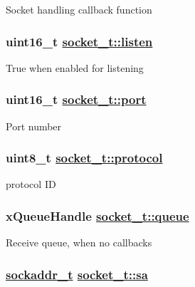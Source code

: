 Socket handling callback function \hypertarget{structsocket__t_367f8e34a0abb424055cc8fcb3388705}{
\subsubsection[listen]{\setlength{\rightskip}{0pt plus 5cm}uint16\_\-t \hyperlink{structsocket__t_367f8e34a0abb424055cc8fcb3388705}{socket\_\-t::listen}}}
\label{structsocket__t_367f8e34a0abb424055cc8fcb3388705}


True when enabled for listening \hypertarget{structsocket__t_584532d6d7f8a88d0b8e5b263dba7621}{
\subsubsection[port]{\setlength{\rightskip}{0pt plus 5cm}uint16\_\-t \hyperlink{structsocket__t_584532d6d7f8a88d0b8e5b263dba7621}{socket\_\-t::port}}}
\label{structsocket__t_584532d6d7f8a88d0b8e5b263dba7621}


Port number \hypertarget{structsocket__t_70368ea424aea352c4705a6c210949f7}{
\subsubsection[protocol]{\setlength{\rightskip}{0pt plus 5cm}uint8\_\-t \hyperlink{structsocket__t_70368ea424aea352c4705a6c210949f7}{socket\_\-t::protocol}}}
\label{structsocket__t_70368ea424aea352c4705a6c210949f7}


protocol ID \hypertarget{structsocket__t_6fdb7e88bf89a5bc524a576a7b2a2ac8}{
\subsubsection[queue]{\setlength{\rightskip}{0pt plus 5cm}x\-Queue\-Handle \hyperlink{structsocket__t_6fdb7e88bf89a5bc524a576a7b2a2ac8}{socket\_\-t::queue}}}
\label{structsocket__t_6fdb7e88bf89a5bc524a576a7b2a2ac8}


Receive queue, when no callbacks \hypertarget{structsocket__t_dd056ea6adc14e1cb056e3195ee540c2}{
\subsubsection[sa]{\setlength{\rightskip}{0pt plus 5cm}\hyperlink{structsockaddr__t}{sockaddr\_\-t} \hyperlink{structsocket__t_dd056ea6adc14e1cb056e3195ee540c2}{socket\_\-t::sa}}}
\label{structsocket__t_dd056ea6adc14e1cb056e3195ee540c2}


